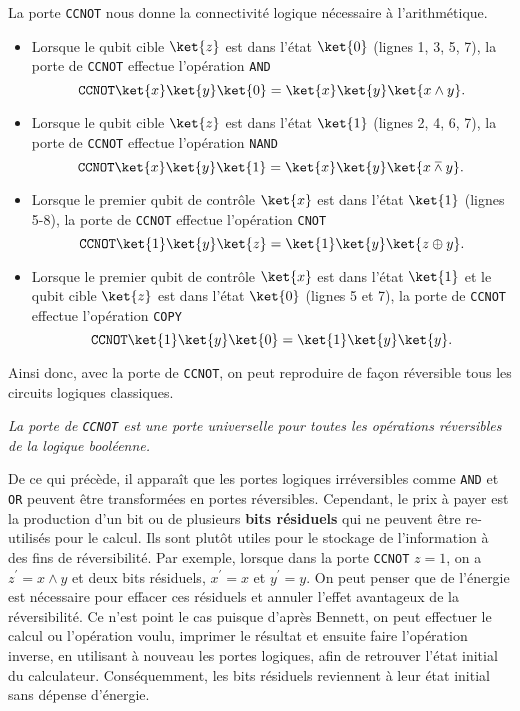 La porte \texttt{CCNOT} nous donne la connectivité logique nécessaire à
l'arithmétique.
\begin{itemize}
\item Lorsque le qubit cible $\ket{z}$ est dans l'état $\ket{0}$ (lignes 1, 3,
5, 7), la porte de \texttt{CCNOT} effectue l'opération \texttt{AND}
\begin{equation}
\texttt{CCNOT}\ket{x}\ket{y}\ket{0}=\ket{x}\ket{y}\ket{x\wedge y}.
\end{equation}

\item Lorsque le qubit cible $\ket{z}$ est dans l'état $\ket{1}$ (lignes 2, 4,
6, 7), la porte de \texttt{CCNOT} effectue l'opération \texttt{NAND}
\begin{equation}
\texttt{CCNOT}\ket{x}\ket{y}\ket{1}=\ket{x}\ket{y}\ket{x\barwedge y}.
\end{equation}

\item Lorsque le premier qubit de contrôle $\ket{x}$ est dans l'état $\ket{1}$
(lignes 5-8), la porte de \texttt{CCNOT} effectue l'opération \texttt{CNOT}
\begin{equation}
\texttt{CCNOT}\ket{1}\ket{y}\ket{z}=\ket{1} \ket{y}\ket{z\oplus y}.
\end{equation}

\item Lorsque le premier qubit de contrôle $\ket{x}$ est dans l'état $\ket{1}$
et le qubit cible $\ket{z}$ est dans l'état $\ket{0}$ (lignes 5 et 7), la porte
de \texttt{CCNOT} effectue l'opération \texttt{COPY}
\begin{equation}
\texttt{CCNOT}\ket{1}\ket{y}\ket{0}=\ket{1}\ket{y}\ket{y}.
\end{equation}
\end{itemize}

Ainsi donc, avec la porte de \texttt{CCNOT}, on peut reproduire de façon
réversible tous les circuits logiques classiques.

\medskip\colorbox[gray]{0.8}{
\parbox[c]{0.9\textwidth}{
\emph{La porte de \texttt{CCNOT} est une porte universelle pour toutes
les opérations réversibles de la logique booléenne.}
}}

De ce qui précède, il apparaît que les portes logiques irréversibles comme
\texttt{AND} et \texttt{OR} peuvent être transformées en portes réversibles.
Cependant, le prix à payer est la production d'un bit ou de plusieurs
\textbf{bits résiduels} qui ne peuvent être re-utilisés pour le calcul. Ils
sont plutôt utiles pour le stockage de l'information à des fins de
réversibilité. Par exemple, lorsque dans la porte \texttt{CCNOT} $z=1$, on a
$z^{\prime}=x\wedge y$ et deux bits résiduels, $x^{\prime}=x$ et $y^{\prime
}=y$. On peut penser que de l'énergie est nécessaire pour effacer ces
résiduels et annuler l'effet avantageux de la réversibilité. Ce n'est point le
cas puisque d'après Bennett, on peut effectuer le calcul ou l'opération voulu,
imprimer le résultat et ensuite faire l'opération inverse, en utilisant à
nouveau les portes logiques, afin de retrouver l'état initial du calculateur.
Conséquemment, les bits résiduels reviennent à leur état initial sans dépense
d'énergie.

